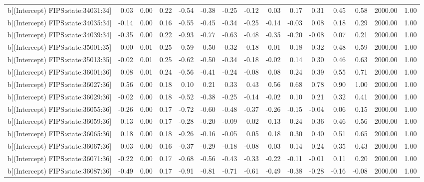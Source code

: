 \begin{table}[ht]
\begin{tabular}{rrrrrrrrrrrrrrr}
  b[(Intercept) FIPS:state:34031:34] & 0.03 & 0.00 & 0.22 & -0.54 & -0.38 & -0.25 & -0.12 & 0.03 & 0.17 & 0.31 & 0.45 & 0.58 & 2000.00 & 1.00 \\ 
  b[(Intercept) FIPS:state:34035:34] & -0.14 & 0.00 & 0.16 & -0.55 & -0.45 & -0.34 & -0.25 & -0.14 & -0.03 & 0.08 & 0.18 & 0.29 & 2000.00 & 1.00 \\ 
  b[(Intercept) FIPS:state:34039:34] & -0.35 & 0.00 & 0.22 & -0.93 & -0.77 & -0.63 & -0.48 & -0.35 & -0.20 & -0.08 & 0.07 & 0.21 & 2000.00 & 1.00 \\ 
  b[(Intercept) FIPS:state:35001:35] & 0.00 & 0.01 & 0.25 & -0.59 & -0.50 & -0.32 & -0.18 & 0.01 & 0.18 & 0.32 & 0.48 & 0.59 & 2000.00 & 1.00 \\ 
  b[(Intercept) FIPS:state:35013:35] & -0.02 & 0.01 & 0.25 & -0.62 & -0.50 & -0.34 & -0.18 & -0.02 & 0.14 & 0.30 & 0.46 & 0.63 & 2000.00 & 1.00 \\ 
  b[(Intercept) FIPS:state:36001:36] & 0.08 & 0.01 & 0.24 & -0.56 & -0.41 & -0.24 & -0.08 & 0.08 & 0.24 & 0.39 & 0.55 & 0.71 & 2000.00 & 1.00 \\ 
  b[(Intercept) FIPS:state:36027:36] & 0.56 & 0.00 & 0.18 & 0.10 & 0.21 & 0.33 & 0.43 & 0.56 & 0.68 & 0.78 & 0.90 & 1.00 & 2000.00 & 1.00 \\ 
  b[(Intercept) FIPS:state:36029:36] & -0.02 & 0.00 & 0.18 & -0.52 & -0.38 & -0.25 & -0.14 & -0.02 & 0.10 & 0.21 & 0.32 & 0.41 & 2000.00 & 1.00 \\ 
  b[(Intercept) FIPS:state:36055:36] & -0.26 & 0.00 & 0.17 & -0.72 & -0.60 & -0.48 & -0.37 & -0.26 & -0.15 & -0.04 & 0.06 & 0.15 & 2000.00 & 1.00 \\ 
  b[(Intercept) FIPS:state:36059:36] & 0.13 & 0.00 & 0.17 & -0.28 & -0.20 & -0.09 & 0.02 & 0.13 & 0.24 & 0.36 & 0.46 & 0.56 & 2000.00 & 1.00 \\ 
  b[(Intercept) FIPS:state:36065:36] & 0.18 & 0.00 & 0.18 & -0.26 & -0.16 & -0.05 & 0.05 & 0.18 & 0.30 & 0.40 & 0.51 & 0.65 & 2000.00 & 1.00 \\ 
  b[(Intercept) FIPS:state:36067:36] & 0.03 & 0.00 & 0.16 & -0.37 & -0.29 & -0.18 & -0.08 & 0.03 & 0.14 & 0.24 & 0.35 & 0.43 & 2000.00 & 1.00 \\ 
  b[(Intercept) FIPS:state:36071:36] & -0.22 & 0.00 & 0.17 & -0.68 & -0.56 & -0.43 & -0.33 & -0.22 & -0.11 & -0.01 & 0.11 & 0.20 & 2000.00 & 1.00 \\ 
  b[(Intercept) FIPS:state:36087:36] & -0.49 & 0.00 & 0.17 & -0.91 & -0.81 & -0.71 & -0.61 & -0.49 & -0.38 & -0.28 & -0.16 & -0.08 & 2000.00 & 1.00 \\ 

\end{tabular}
\end{table}
